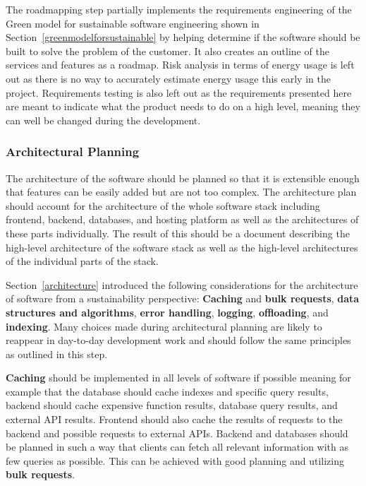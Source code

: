 The roadmapping step partially implements the requirements engineering of the Green model for sustainable software engineering shown in Section~\ref{greenmodelforsustainable} by helping determine if the software should be built to solve the problem of the customer. It also creates an outline of the services and features as a roadmap. Risk analysis in terms of energy usage is left out as there is no way to accurately estimate energy usage this early in the project. Requirements testing is also left out as the requirements presented here are meant to indicate what the product needs to do on a high level, meaning they can well be changed during the development.

\subsubsection{Architectural Planning}
The architecture of the software should be planned so that it is extensible enough that features can be easily added but are not too complex. The architecture plan should account for the architecture of the whole software stack including frontend, backend, databases, and hosting platform as well as the architectures of these parts individually. The result of this should be a document describing the high-level architecture of the software stack as well as the high-level architectures of the individual parts of the stack.

Section~\ref{architecture} introduced the following considerations for the architecture of software from a sustainability perspective: \textbf{Caching} and \textbf{bulk requests}, \textbf{data structures and algorithms}, \textbf{error handling}, \textbf{logging}, \textbf{offloading}, and \textbf{indexing}. Many choices made during architectural planning are likely to reappear in day-to-day development work and should follow the same principles as outlined in this step.

\textbf{Caching} should be implemented in all levels of software if possible meaning for example that the database should cache indexes and specific query results, backend should cache expensive function results, database query results, and external API results. Frontend should also cache the results of requests to the backend and possible requests to external APIs. Backend and databases should be planned in such a way that clients can fetch all relevant information with as few queries as possible. This can be achieved with good planning and utilizing \textbf{bulk requests}.

